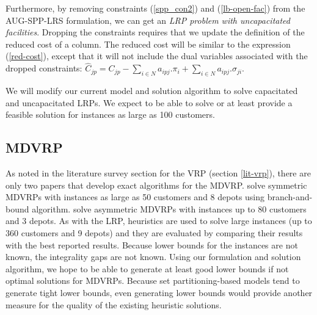 Furthermore, by removing constraints (\ref{spp_con2}) and (\ref{lb-open-fac}) 
from the AUG-SPP-LRS formulation, we can get an 
{\em LRP problem with uncapacitated facilities}. Dropping the constraints 
requires that we update the definition of the reduced cost of a column. 
The reduced cost will be similar to the expression (\ref{red-cost}), except
that it will not include the dual variables associated with the dropped 
constraints: 
$\hat{C}_{jp}=C_{jp}-\sum_{i\in N}a_{ipj}.\pi_{i}+\sum_{i \in N}a_{ipj}.\sigma_{ji}$.

We will modify our current model and solution algorithm to solve capacitated and
uncapacitated LRPs. We expect to be able to solve or at least provide a feasible
solution  for instances
as large as 100 customers. 

\subsection{MDVRP}

As noted in the literature survey section for the VRP (section \ref{lit-vrp}), 
there are only two papers that develop exact algorithms for the MDVRP. 
\citet{Laporte6} solve symmetric MDVRPs with instances as large as 
 50 customers and 8 depots using branch-and-bound algorithm. \citet{Laporte7} 
solve asymmetric MDVRPs with instances up to 80 customers and 3 depots. 
As with the LRP, heuristics are used to solve large instances (up to 360 customers 
and 9 depots) and they are evaluated by comparing their results with the best 
reported results. Because lower bounds for the instances are not known, the 
integrality gaps are not known. Using our formulation and solution algorithm, 
we hope to be able to generate at least good lower bounds if not optimal
solutions for MDVRPs. Because set partitioning-based models tend to generate 
tight lower bounds, even generating lower bounds would provide another measure 
for the quality of the existing heuristic solutions. 

